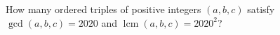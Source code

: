 How many ordered triples of positive integers $(a,b,c)$ satisfy $\gcd(a,b,c)=2020$ and $\operatorname{lcm}(a,b,c)=2020^2$?
